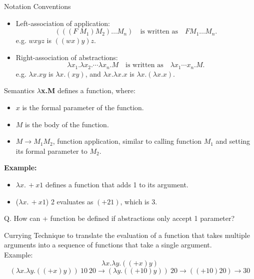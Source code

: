 \documentclass{beamer}
\begin{document}
\begin{frame}{Notation Conventions}
  \begin{itemize}
    \item Left-association of application:
      \[
        (((F \; M_1)M_2)\ldots M_n) \quad\text{is written as}\quad F M_1 \ldots M_n.
      \]
      e.g. \(wxyz\) is \(((wx)y)z\).
    \item Right-association of abstractions:
      \[
        \lambda x_1.\lambda x_2.\cdots\lambda x_n.M \quad\text{is written as}\quad \lambda x_1 \cdots x_n.M.
      \]
      e.g. \(\lambda x.xy\) is \(\lambda x.(xy)\), and
      \(\lambda x.\lambda x.x\) is \(\lambda x.(\lambda x.x)\).
  \end{itemize}
\end{frame}
\begin{frame}{Semantics}
  \textbf{$\lambda$x.M} defines a function, where:
  \begin{itemize}
    \item $x$ is the formal parameter of the function.
    \item $M$ is the body of the function.
    \item $M \to M_1 M_2$, function application, similar to calling function $M_1$ and setting its formal parameter to $M_2$.
  \end{itemize}
  \vspace{1em}
  \textbf{Example:}
  \begin{itemize}
    \item $\lambda x.\,+ x 1$ defines a function that adds 1 to its argument.
    \item ($\lambda x.\,+ x 1$) 2 evaluates as $(+ 2 1)$, which is 3.
  \end{itemize}
  \begin{block}{}
    Q. How can + function be defined if abstractions only accept 1 parameter?\\
  \end{block}
\end{frame}
\begin{frame}{Currying}
  Technique to translate the evaluation of a function that takes multiple arguments into a sequence of functions that take a single argument.\\
  \vspace{1em}
  Example:
  \[
  \lambda x.\lambda y.((+ x)y)
  \]
  \[
  (\lambda x.\lambda y.((+ x)y))\ 10\ 20 \rightarrow (\lambda y.((+ 10)y))\ 20 \rightarrow ((+ 10)20) \rightarrow 30
  \]
\end{frame}
\end{document}
